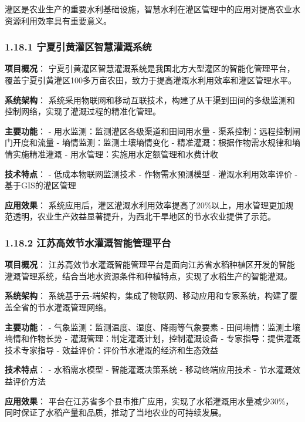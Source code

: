 灌区是农业生产的重要水利基础设施，智慧水利在灌区管理中的应用对提高农业水资源利用效率具有重要意义。

\subsubsection{1.18.1
宁夏引黄灌区智慧灌溉系统}\label{ux5b81ux590fux5f15ux9ec4ux704cux533aux667aux6167ux704cux6e89ux7cfbux7edf}

\textbf{项目概况}：
宁夏引黄灌区智慧灌溉系统是我国北方大型灌区的智能化管理平台，覆盖宁夏引黄灌区100多万亩农田，致力于提高灌溉水利用效率和灌区管理水平。

\textbf{系统架构}：
系统采用物联网和移动互联技术，构建了从干渠到田间的多级监测和控制网络，实现了灌溉过程的精准化管理。

\textbf{主要功能}： - 用水监测：监测灌区各级渠道和田间用水量 -
渠系控制：远程控制闸门开度和流量 - 墒情监测：监测土壤墒情变化 -
精准灌溉：根据作物需水规律和墒情实施精准灌溉 -
用水管理：实施用水定额管理和水费计收

\textbf{技术特点}： - 低成本物联网监测技术 - 作物需水预测模型 -
灌溉水利用效率评价 - 基于GIS的灌区管理

\textbf{应用效果}：
系统应用后，灌区灌溉水利用效率提高了20\%以上，用水管理更加规范透明，农业生产效益显著提升，为西北干旱地区的节水农业提供了示范。

\subsubsection{1.18.2
江苏高效节水灌溉智能管理平台}\label{ux6c5fux82cfux9ad8ux6548ux8282ux6c34ux704cux6e89ux667aux80fdux7ba1ux7406ux5e73ux53f0}

\textbf{项目概况}：
江苏高效节水灌溉智能管理平台是面向江苏省水稻种植区开发的智能灌溉管理系统，结合当地水资源条件和种植特点，实现了水稻生产的智能灌溉。

\textbf{系统架构}：
系统基于云-端架构，集成了物联网、移动应用和专家系统，构建了覆盖全省的节水灌溉管理网络。

\textbf{主要功能}： - 气象监测：监测温度、湿度、降雨等气象要素 -
田间墒情：监测土壤墒情和作物长势 - 灌溉管理：制定灌溉计划，控制灌溉设备
- 专家指导：提供灌溉技术专家指导 -
效益评价：评价节水灌溉的经济和生态效益

\textbf{技术特点}： - 水稻需水模型 - 智能灌溉决策系统 - 移动终端应用技术
- 节水灌溉效益评价方法

\textbf{应用效果}：
平台在江苏省多个县市推广应用，实现了水稻灌溉用水量减少30\%，同时保证了水稻产量和品质，推动了当地农业的可持续发展。

